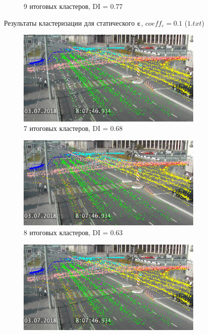 \begin{figure}[!htb]
\begin{subfigure}[!htb]{0.8\textwidth}
		\caption{9 итоговых кластеров, DI = 0.77}
		\label{fig:1-9cl-01}
	\end{subfigure}
	\caption{Результаты кластеризации для статического $\bm{\varepsilon}$, $coeff_\varepsilon = 0.1$ ($1.txt$)}
	\label{fig:clust-res-1-01}
\end{figure}

\begin{figure}[!htb]
	\centering
	\begin{subfigure}[!htb]{0.8\textwidth}
		\centering{}
		\includegraphics[width=\textwidth]{images/cl-res/1-7cl-015.png}
		\caption{7 итоговых кластеров, DI = 0.68}
		\label{fig:1-7cl-015}
	\end{subfigure}
	\hfill
	\begin{subfigure}[!htb]{0.8\textwidth}
		\centering{}
		\includegraphics[width=\textwidth]{images/cl-res/1-8cl-015.png}
		\caption{8 итоговых кластеров, DI = 0.63}
		\label{fig:1-8cl-015}
	\end{subfigure}
	\hfill
	\begin{subfigure}[!htb]{0.8\textwidth}
		\centering{}
		\includegraphics[width=\textwidth]{images/cl-res/1-9cl-015.png}

\end{subfigure}
\end{figure}
